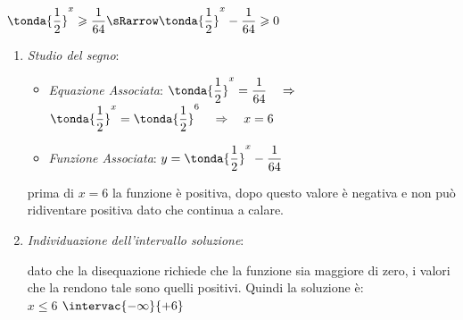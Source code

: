 \begin{esempio}
\(\tonda{\dfrac{1}{2}}^x \geqslant \dfrac{1}{64} \sRarrow 
  \tonda{\dfrac{1}{2}}^x - \dfrac{1}{64} \geqslant 0\)

\begin{enumerate} [noitemsep]
 \item \emph{Studio del segno}:
 \begin{itemize} [noitemsep]
  \item \emph{Equazione Associata}: 
  \(\tonda{\dfrac{1}{2}}^x = \dfrac{1}{64} \quad\Rightarrow \quad\)
   \(\tonda{\dfrac{1}{2}}^x = \tonda{\dfrac{1}{2}}^6 \quad \Rightarrow 
\quad x= 6\)
 \end{itemize}
\begin{minipage}{.5\textwidth}
\begin{itemize} [noitemsep]
\item \emph{Funzione Associata}: \(y=\tonda{\dfrac{1}{2}}^x -\dfrac{1}{64}\)
\end{itemize}
prima di \(x=6\) la funzione è positiva, dopo questo valore è negativa e 
non può ridiventare positiva dato che continua a calare.
\end{minipage}
 \begin{minipage}{.5\textwidth}
 \begin{inaccessibleblock}
 \end{inaccessibleblock}
  \end{minipage}

\vspace{15pt}
 \item \emph{Individuazione dell'intervallo soluzione}:

dato che la disequazione richiede che la funzione sia maggiore di zero, 
i valori che la rendono tale sono quelli positivi. 
Quindi la soluzione è:\\[7pt]

                  {\(x \leqslant 6\)}
                  {\(\intervac{-\infty}{+6}\)}

\end{enumerate}
\end{esempio}

